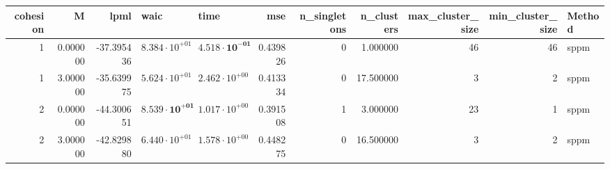 \begin{tabular}{rrrllrrrrrl}
\toprule
cohesion & M & lpml & waic & time & mse & n_singletons & n_clusters & max_cluster_size & min_cluster_size & Method \\
\midrule
1 & 0.000000 & -37.395436 & $8.384 \cdot 10^{+01}$ & $\mathbf{4.518 \cdot 10^{-01}}$ & 0.439826 & 0 & 1.000000 & 46 & 46 & sppm \\
1 & 3.000000 & -35.639975 & $5.624 \cdot 10^{+01}$ & $2.462 \cdot 10^{+00}$ & 0.413334 & 0 & 17.500000 & 3 & 2 & sppm \\
2 & 0.000000 & -44.300651 & $\mathbf{8.539 \cdot 10^{+01}}$ & $1.017 \cdot 10^{+00}$ & 0.391508 & 1 & 3.000000 & 23 & 1 & sppm \\
2 & 3.000000 & -42.829880 & $6.440 \cdot 10^{+01}$ & $1.578 \cdot 10^{+00}$ & 0.448275 & 0 & 16.500000 & 3 & 2 & sppm \\
\bottomrule
\end{tabular}
